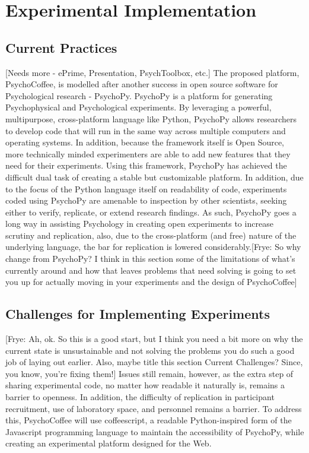 \documentclass[12pt,a4paper,titlepage]{scrreprt}
\begin{document}
\section{Experimental Implementation}
\subsection{Current Practices}
[Needs more - ePrime, Presentation, PsychToolbox, etc.]
The proposed platform, PsychoCoffee, is modelled after another success in open source software for Psychological research - PsychoPy\cite{peirce_psychopypsychophysics_2007,peirce_generating_2008}. PsychoPy is a platform for generating Psychophysical and Psychological experiments. By leveraging a powerful, multipurpose, cross-platform language like Python, PsychoPy allows researchers to develop code that will run in the same way across multiple computers and operating systems. In addition, because the framework itself is Open Source, more technically minded experimenters are able to add new features that they need for their experiments. Using this framework, PsychoPy has achieved the difficult dual task of creating a stable but customizable platform. In addition, due to the focus of the Python language itself on readability of code\cite{_python_????}, experiments coded using PsychoPy are amenable to inspection by other scientists, seeking either to verify, replicate, or extend research findings. As such, PsychoPy goes a long way in assisting Psychology in creating open experiments to increase scrutiny and replication, also, due to the cross-platform (and free) nature of the underlying language, the bar for replication is lowered considerably.[Frye: So why change from PsychoPy? I think in this section some of the limitations of what's currently around and how that leaves problems that need solving is going to set you up for actually moving in your experiments and the design of PsychoCoffee]
\subsection{Challenges for Implementing Experiments}
[Frye: Ah, ok. So this is a good start, but I think you need a bit more on why the current state is unsustainable and not solving the problems you do such a good job of laying out earlier. Also, maybe title this section Current Challenges? Since, you know, you're fixing them!]
Issues still remain, however, as the extra step of sharing experimental code, no matter how readable it naturally is, remains a barrier to openness. In addition, the difficulty of replication in participant recruitment, use of laboratory space, and personnel remains a barrier. To address this, PsychoCoffee will use coffeescript, a readable Python-inspired form of the Javascript programming language to maintain the accessibility of PsychoPy, while creating an experimental platform designed for the Web.
\end{document}
